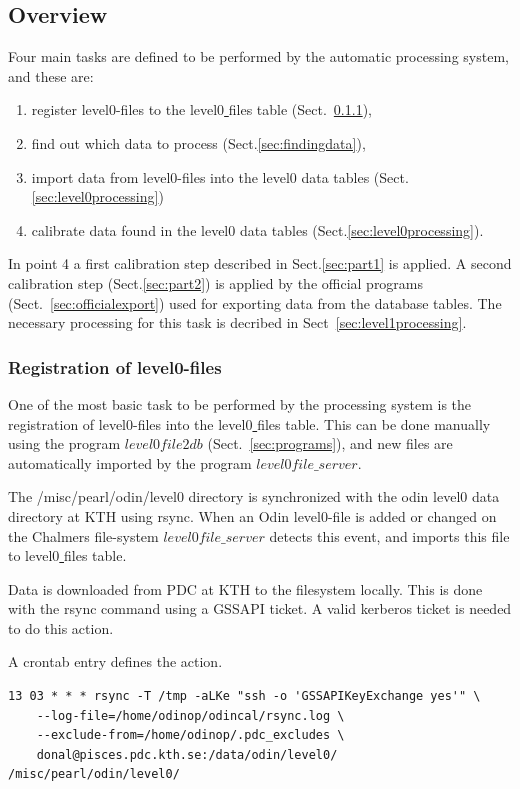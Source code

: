 \documentclass[12pt]{article}
\begin{document}
\subsection{Overview}
Four main tasks are defined to be performed by the 
automatic processing system, 
and these are:
\begin{enumerate}
\item register level0-files to the level0\underline{ }files table
(Sect.~\ref{sec:registration}),
\item find out which data to process (Sect.\ref{sec:findingdata}),
\item import data from level0-files into the level0 data tables
(Sect.\ref{sec:level0processing})
\item calibrate data found in the level0 data tables
(Sect.\ref{sec:level0processing}).
\end{enumerate}

In point 4 a first calibration step described
in Sect.\ref{sec:part1} is applied.
A second calibration step (Sect.\ref{sec:part2}) is applied
by the official programs (Sect.~\ref{sec:officialexport})
used for exporting data from the database tables.
The necessary processing for this task is decribed 
in Sect~\ref{sec:level1processing}.




\subsubsection{Registration of level0-files}
\label{sec:registration}
One of the most basic task to be performed by the processing system is the
registration of level0-files into the level0\underline{ }files table.
This can be done manually using the program \(level0file2db\)
(Sect.~\ref{sec:programs}), and new files are automatically
imported by the program \(level0file\_server\).

The /misc/pearl/odin/level0 directory
is synchronized with the odin level0 data directory at KTH using rsync. 
When an Odin level0-file is added or changed on the Chalmers file-system
\(level0file\_server\)  detects this event, and imports this
file to level0\underline{ }files table.

Data is downloaded from PDC at KTH to the filesystem locally. This is done with the rsync command using a GSSAPI ticket. A valid kerberos ticket is needed to do this action.

A crontab entry defines the action.
\begin{verbatim}
13 03 * * * rsync -T /tmp -aLKe "ssh -o 'GSSAPIKeyExchange yes'" \
    --log-file=/home/odinop/odincal/rsync.log \
    --exclude-from=/home/odinop/.pdc_excludes \
    donal@pisces.pdc.kth.se:/data/odin/level0/ /misc/pearl/odin/level0/
\end{verbatim}
\end{document}
